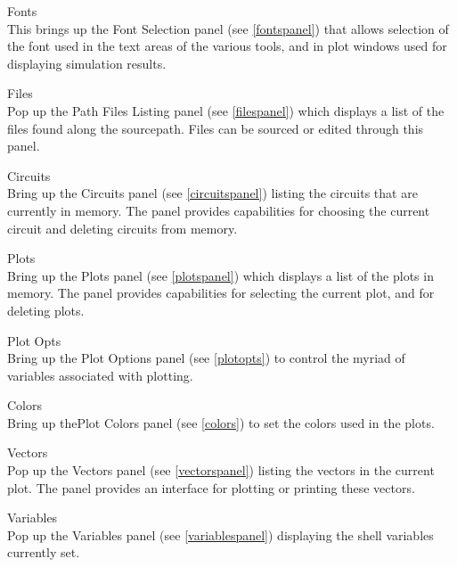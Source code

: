 \begin{description}
\item{\cb Fonts}\\
This brings up the {\cb Font Selection} panel (see \ref{fontspanel})
that allows selection of the font used in the text areas of the
various tools, and in plot windows used for displaying simulation
results.

\item{\cb Files}\\
Pop up the {\cb Path Files Listing} panel (see \ref{filespanel}) which
displays a list of the files found along the {\et sourcepath}.  Files
can be sourced or edited through this panel.

\item{\cb Circuits}\\
Bring up the {\cb Circuits} panel (see \ref{circuitspanel}) listing
the circuits that are currently in memory.  The panel provides
capabilities for choosing the current circuit and deleting circuits
from memory.

\item{\cb Plots}\\
Bring up the {\cb Plots} panel (see \ref{plotspanel}) which displays a
list of the plots in memory.  The panel provides capabilities for
selecting the current plot, and for deleting plots.

\item{\cb Plot Opts}\\
Bring up the {\cb Plot Options} panel (see \ref{plotopts}) to
control the myriad of variables associated with plotting.

\item{\cb Colors}\\
Bring up the{\cb Plot Colors} panel (see \ref{colors}) to set the
colors used in the plots.

\item{\cb Vectors}\\
Pop up the {\cb Vectors} panel (see \ref{vectorspanel}) listing the
vectors in the current plot.  The panel provides an interface for
plotting or printing these vectors.

\item{\cb Variables}\\
Pop up the {\cb Variables} panel (see \ref{variablespanel}) displaying
the shell variables currently set.


\end{description}
